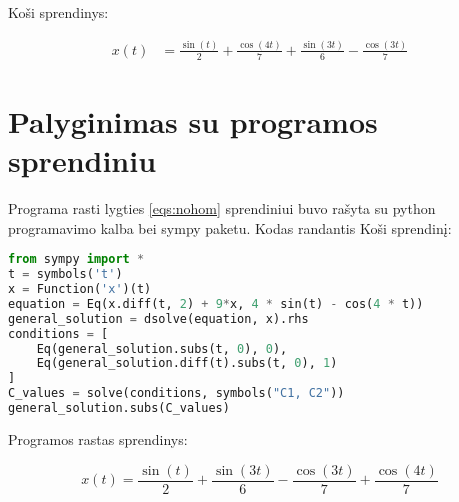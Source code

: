 \documentclass[11pt]{article}
\begin{document}
Koši sprendinys:

\begin{align}
x(t)&=\frac{\sin(t)}{2}+\frac{\cos(4t)}{7}+\frac{\sin(3t)}{6}-\frac{\cos(3t)}{7}
\end{align}

\section{Palyginimas su programos sprendiniu}

Programa rasti lygties \eqref{eqs:nohom} sprendiniui buvo rašyta su python programavimo
kalba bei sympy paketu. Kodas randantis Koši sprendinį:

\begin{lstlisting}[language=Python]
from sympy import *
t = symbols('t')
x = Function('x')(t)
equation = Eq(x.diff(t, 2) + 9*x, 4 * sin(t) - cos(4 * t))
general_solution = dsolve(equation, x).rhs
conditions = [
    Eq(general_solution.subs(t, 0), 0),
    Eq(general_solution.diff(t).subs(t, 0), 1)
]
C_values = solve(conditions, symbols("C1, C2"))
general_solution.subs(C_values)
\end{lstlisting}

Programos rastas sprendinys:

$$
x(t)=\frac{\sin(t)}{2}+\frac{\sin(3t)}{6}-\frac{\cos(3t)}{7}+\frac{\cos(4t)}{7}
$$
\end{document}
